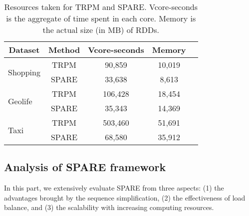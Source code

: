 \begin{table}[h]
\centering
\caption{Resources taken for TRPM and SPARE. Vcore-seconds is the aggregate of time spent in each core. Memory is the actual size (in MB) of RDDs.}
\label{tbl:resource}
\begin{tabular}{|l|c|c|c|c|}
\hline
\multicolumn{1}{|c|}{\textbf{Dataset}} & \textbf{Method} 
& \textbf{Vcore-seconds} & \textbf{Memory} \\ \hline
\multirow{2}{*}{Shopping}              & TRPM           
                               & 90,859                 & 10,019               \\ 
                                       & SPARE           
                                                                      & 33,638                 & 8,613                \\ \hline
\multirow{2}{*}{Geolife}               & TRPM            
                              & 106,428                & 18,454               \\
                                       & SPARE            
                                                                     & 35,343                 & 14,369               \\ \hline
\multirow{2}{*}{Taxi}                  & TRPM            
                           & 503,460                & 51,691               \\ 
                                       & SPARE           
                                                                    & 68,580                & 35,912               \\ \hline
\end{tabular}
\end{table}

\subsection{Analysis of SPARE framework}
In this part, we extensively evaluate SPARE from three aspects:
(1) the advantages brought by the sequence simplification, (2) the effectiveness of load balance, and (3) the scalability with increasing computing resources.


